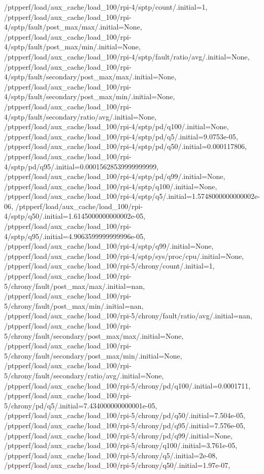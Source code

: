 {    /ptpperf/load/aux_cache/load_100/rpi-4/sptp/count/.initial=1,
    /ptpperf/load/aux_cache/load_100/rpi-4/sptp/fault/post_max/max/.initial=None,
    /ptpperf/load/aux_cache/load_100/rpi-4/sptp/fault/post_max/min/.initial=None,
    /ptpperf/load/aux_cache/load_100/rpi-4/sptp/fault/ratio/avg/.initial=None,
    /ptpperf/load/aux_cache/load_100/rpi-4/sptp/fault/secondary/post_max/max/.initial=None,
    /ptpperf/load/aux_cache/load_100/rpi-4/sptp/fault/secondary/post_max/min/.initial=None,
    /ptpperf/load/aux_cache/load_100/rpi-4/sptp/fault/secondary/ratio/avg/.initial=None,
    /ptpperf/load/aux_cache/load_100/rpi-4/sptp/pd/q100/.initial=None,
    /ptpperf/load/aux_cache/load_100/rpi-4/sptp/pd/q5/.initial=9.0753e-05,
    /ptpperf/load/aux_cache/load_100/rpi-4/sptp/pd/q50/.initial=0.000117806,
    /ptpperf/load/aux_cache/load_100/rpi-4/sptp/pd/q95/.initial=0.00015628539999999999,
    /ptpperf/load/aux_cache/load_100/rpi-4/sptp/pd/q99/.initial=None,
    /ptpperf/load/aux_cache/load_100/rpi-4/sptp/q100/.initial=None,
    /ptpperf/load/aux_cache/load_100/rpi-4/sptp/q5/.initial=1.5748000000000002e-06,
    /ptpperf/load/aux_cache/load_100/rpi-4/sptp/q50/.initial=1.6145000000000002e-05,
    /ptpperf/load/aux_cache/load_100/rpi-4/sptp/q95/.initial=4.9063599999999996e-05,
    /ptpperf/load/aux_cache/load_100/rpi-4/sptp/q99/.initial=None,
    /ptpperf/load/aux_cache/load_100/rpi-4/sptp/sys/proc/cpu/.initial=None,
    /ptpperf/load/aux_cache/load_100/rpi-5/chrony/count/.initial=1,
    /ptpperf/load/aux_cache/load_100/rpi-5/chrony/fault/post_max/max/.initial=nan,
    /ptpperf/load/aux_cache/load_100/rpi-5/chrony/fault/post_max/min/.initial=nan,
    /ptpperf/load/aux_cache/load_100/rpi-5/chrony/fault/ratio/avg/.initial=nan,
    /ptpperf/load/aux_cache/load_100/rpi-5/chrony/fault/secondary/post_max/max/.initial=None,
    /ptpperf/load/aux_cache/load_100/rpi-5/chrony/fault/secondary/post_max/min/.initial=None,
    /ptpperf/load/aux_cache/load_100/rpi-5/chrony/fault/secondary/ratio/avg/.initial=None,
    /ptpperf/load/aux_cache/load_100/rpi-5/chrony/pd/q100/.initial=0.0001711,
    /ptpperf/load/aux_cache/load_100/rpi-5/chrony/pd/q5/.initial=7.434000000000001e-05,
    /ptpperf/load/aux_cache/load_100/rpi-5/chrony/pd/q50/.initial=7.504e-05,
    /ptpperf/load/aux_cache/load_100/rpi-5/chrony/pd/q95/.initial=7.576e-05,
    /ptpperf/load/aux_cache/load_100/rpi-5/chrony/pd/q99/.initial=None,
    /ptpperf/load/aux_cache/load_100/rpi-5/chrony/q100/.initial=3.761e-05,
    /ptpperf/load/aux_cache/load_100/rpi-5/chrony/q5/.initial=2e-08,
    /ptpperf/load/aux_cache/load_100/rpi-5/chrony/q50/.initial=1.97e-07,
}
